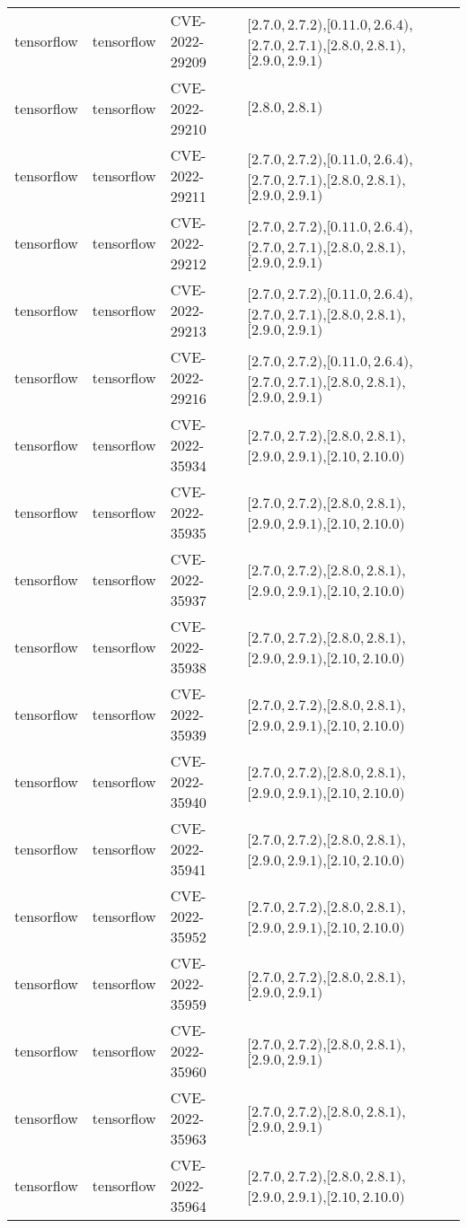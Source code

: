 \begin{tabular}{llll}
tensorflow & tensorflow & CVE-2022-29209 & $[2.7.0,2.7.2)$,$[0.11.0,2.6.4)$,$[2.7.0,2.7.1)$,$[2.8.0,2.8.1)$,$[2.9.0,2.9.1)$ \\
tensorflow & tensorflow & CVE-2022-29210 & $[2.8.0,2.8.1)$ \\
tensorflow & tensorflow & CVE-2022-29211 & $[2.7.0,2.7.2)$,$[0.11.0,2.6.4)$,$[2.7.0,2.7.1)$,$[2.8.0,2.8.1)$,$[2.9.0,2.9.1)$ \\
tensorflow & tensorflow & CVE-2022-29212 & $[2.7.0,2.7.2)$,$[0.11.0,2.6.4)$,$[2.7.0,2.7.1)$,$[2.8.0,2.8.1)$,$[2.9.0,2.9.1)$ \\
tensorflow & tensorflow & CVE-2022-29213 & $[2.7.0,2.7.2)$,$[0.11.0,2.6.4)$,$[2.7.0,2.7.1)$,$[2.8.0,2.8.1)$,$[2.9.0,2.9.1)$ \\
tensorflow & tensorflow & CVE-2022-29216 & $[2.7.0,2.7.2)$,$[0.11.0,2.6.4)$,$[2.7.0,2.7.1)$,$[2.8.0,2.8.1)$,$[2.9.0,2.9.1)$ \\
tensorflow & tensorflow & CVE-2022-35934 & $[2.7.0,2.7.2)$,$[2.8.0,2.8.1)$,$[2.9.0,2.9.1)$,$[2.10,2.10.0)$ \\
tensorflow & tensorflow & CVE-2022-35935 & $[2.7.0,2.7.2)$,$[2.8.0,2.8.1)$,$[2.9.0,2.9.1)$,$[2.10,2.10.0)$ \\
tensorflow & tensorflow & CVE-2022-35937 & $[2.7.0,2.7.2)$,$[2.8.0,2.8.1)$,$[2.9.0,2.9.1)$,$[2.10,2.10.0)$ \\
tensorflow & tensorflow & CVE-2022-35938 & $[2.7.0,2.7.2)$,$[2.8.0,2.8.1)$,$[2.9.0,2.9.1)$,$[2.10,2.10.0)$ \\
tensorflow & tensorflow & CVE-2022-35939 & $[2.7.0,2.7.2)$,$[2.8.0,2.8.1)$,$[2.9.0,2.9.1)$,$[2.10,2.10.0)$ \\
tensorflow & tensorflow & CVE-2022-35940 & $[2.7.0,2.7.2)$,$[2.8.0,2.8.1)$,$[2.9.0,2.9.1)$,$[2.10,2.10.0)$ \\
tensorflow & tensorflow & CVE-2022-35941 & $[2.7.0,2.7.2)$,$[2.8.0,2.8.1)$,$[2.9.0,2.9.1)$,$[2.10,2.10.0)$ \\
tensorflow & tensorflow & CVE-2022-35952 & $[2.7.0,2.7.2)$,$[2.8.0,2.8.1)$,$[2.9.0,2.9.1)$,$[2.10,2.10.0)$ \\
tensorflow & tensorflow & CVE-2022-35959 & $[2.7.0,2.7.2)$,$[2.8.0,2.8.1)$,$[2.9.0,2.9.1)$ \\
tensorflow & tensorflow & CVE-2022-35960 & $[2.7.0,2.7.2)$,$[2.8.0,2.8.1)$,$[2.9.0,2.9.1)$ \\
tensorflow & tensorflow & CVE-2022-35963 & $[2.7.0,2.7.2)$,$[2.8.0,2.8.1)$,$[2.9.0,2.9.1)$ \\
tensorflow & tensorflow & CVE-2022-35964 & $[2.7.0,2.7.2)$,$[2.8.0,2.8.1)$,$[2.9.0,2.9.1)$,$[2.10,2.10.0)$ \\

\end{tabular}
